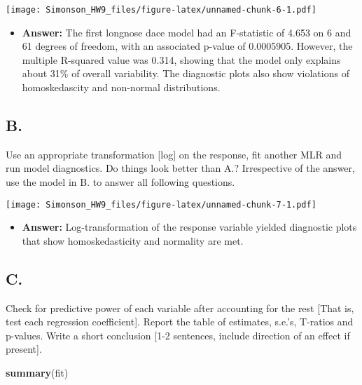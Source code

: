 \documentclass[]{article}
\newenvironment{Shaded}{\begin{snugshade}}{\end{snugshade}}
\newcommand{\KeywordTok}[1]{\textcolor[rgb]{0.13,0.29,0.53}{\textbf{#1}}}
\newcommand{\NormalTok}[1]{#1}
\providecommand{\tightlist}{%
  \setlength{\itemsep}{0pt}\setlength{\parskip}{0pt}}
\begin{document}
\texttt{[image: Simonson\_HW9\_files/figure-latex/unnamed-chunk-6-1.pdf]}

\begin{itemize}
\tightlist
\item
  \textbf{Answer:} The first longnose dace model had an F-statistic of
  4.653 on 6 and 61 degrees of freedom, with an associated p-value of
  0.0005905. However, the multiple R-squared value was 0.314, showing
  that the model only explains about 31\% of overall variability. The
  diagnostic plots also show violations of homoskedascity and non-normal
  distributions.
\end{itemize}

\subsection{B.}\label{b.-1}

Use an appropriate transformation {[}log{]} on the response, fit another
MLR and run model diagnostics. Do things look better than A.?
Irrespective of the answer, use the model in B. to answer all following
questions.

\texttt{[image: Simonson\_HW9\_files/figure-latex/unnamed-chunk-7-1.pdf]}

\begin{itemize}
\tightlist
\item
  \textbf{Answer:} Log-transformation of the response variable yielded
  diagnostic plots that show homoskedasticity and normality are met.
\end{itemize}

\subsection{C.}\label{c.-1}

Check for predictive power of each variable after accounting for the
rest {[}That is, test each regression coefficient{]}. Report the table
of estimates, s.e.'s, T-ratios and p-values. Write a short conclusion
{[}1-2 sentences, include direction of an effect if present{]}.

\begin{Shaded}
\begin{Highlighting}[]
\KeywordTok{summary}\NormalTok{(fit)}
\end{Highlighting}
\end{Shaded}
\end{document}
